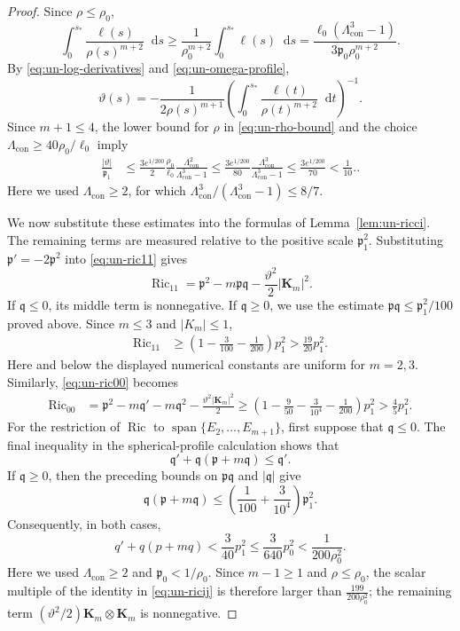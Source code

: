 \documentclass[11pt,reqno]{amsart}
\theoremstyle{definition}
\numberwithin{equation}{section}
\DeclareMathOperator{\Ric}{Ric}
\newcommand{\dd}{\mathop{}\!\mathrm d}
\begin{document}
\begin{proof}
Since \(\rho\le\rho_0\),
\[
 \int_0^{s_*}\frac{\ell(s)}{\rho(s)^{m+2}}\dd s
 \ge\frac1{\rho_0^{m+2}}\int_0^{s_*}\ell(s)\dd s
 =\frac{\ell_0(\Lambda_{\mathrm{con}}^3-1)}
 {3\mathfrak p_0\rho_0^{m+2}}.
\]
By \eqref{eq:un-log-derivatives} and
\eqref{eq:un-omega-profile},
\[
 \vartheta(s)=-\frac1{2\rho(s)^{m+1}}
 \left(\int_0^{s_*}\frac{\ell(t)}{\rho(t)^{m+2}}\dd t\right)^{-1}.
\]
Since \(m+1\le4\), the lower bound for \(\rho\) in
\eqref{eq:un-rho-bound} and the choice
\(\Lambda_{\mathrm{con}}\ge40\rho_0/\ell_0\) imply
\begin{align}
 \frac{|\vartheta|}{\mathfrak p_1}
 &\le\frac{3e^{1/200}}2
       \frac{\rho_0}{\ell_0}
       \frac{\Lambda_{\mathrm{con}}^2}
            {\Lambda_{\mathrm{con}}^3-1}\le\frac{3e^{1/200}}{80}
       \frac{\Lambda_{\mathrm{con}}^3}
            {\Lambda_{\mathrm{con}}^3-1}\le\frac{3e^{1/200}}{70}<\frac{1}{10}..
 \label{eq:un-twist-rate-bound}
\end{align}
Here we used \(\Lambda_{\mathrm{con}}\ge2\), for which
\(\Lambda_{\mathrm{con}}^3/
(\Lambda_{\mathrm{con}}^3-1)\le8/7\).

We now substitute these estimates into the formulas of
Lemma~\ref{lem:un-ricci}.  The remaining terms are measured relative to
the positive scale \(\mathfrak p_1^2\).  Substituting
\(\mathfrak p'=-2\mathfrak p^2\) into
\eqref{eq:un-ric11} gives
\[
 \Ric_{11}=\mathfrak p^2-m\mathfrak p\mathfrak q
            -\frac{\vartheta^2}{2}|\mathbf K_m|^2.
\]
If \(\mathfrak q\le0\), its middle term is nonnegative.  If
\(\mathfrak q\ge0\), we use the estimate
\(\mathfrak p\mathfrak q\le\mathfrak p_1^2/100\) proved above.
Since \(m\le3\) and \(|K_m|\le1\),
\begin{align*}
 \Ric_{11}
 &\ge\left(
  1-\frac{3}{100}-\frac{1}{200}
 \right)p_1^2
 >\frac{19}{20}p_1^2.
\end{align*}
Here and below the displayed numerical constants are uniform for
\(m=2,3\).  Similarly, \eqref{eq:un-ric00} becomes
\begin{align*}
 \Ric_{00}
 &=\mathfrak p^2-m\mathfrak q'-m\mathfrak q^2
   -\frac{\vartheta^2\lvert\mathbf K_m\rvert^2}{2}\ge
 \left(
  1-\frac{9}{50}-\frac{3}{10^4}-\frac{1}{200}
 \right)p_1^2
 >
 \frac45p_1^2.
\end{align*}
For the restriction of \(\Ric\) to
\(\operatorname{span}\{E_2,\ldots,E_{m+1}\}\), first suppose that
\(\mathfrak q\le0\).  The final inequality in the spherical-profile
calculation shows that
\[
 \mathfrak q'+\mathfrak q(\mathfrak p+m\mathfrak q)
 \le\mathfrak q'.
\]
If \(\mathfrak q\ge0\), then the preceding bounds on
\(\mathfrak p\mathfrak q\) and \(|\mathfrak q|\) give
\[
 \mathfrak q(\mathfrak p+m\mathfrak q)
 \le\left(\frac1{100}+\frac3{10^4}\right)\mathfrak p_1^2.
\]
Consequently, in both cases,
\[
q'+q(p+mq)
 <
 \frac{3}{40}p_1^2
 \le
 \frac{3}{640}p_0^2
 <
 \frac{1}{200\rho_0^2}.
\]
Here we used \(\Lambda_{\mathrm{con}}\ge2\) and
\(\mathfrak p_0<1/\rho_0\).  Since \(m-1\ge1\)
and \(\rho\le\rho_0\), the scalar multiple of the identity in
\eqref{eq:un-ricij} is therefore larger than
\(\frac{199}{200\rho_0^2}\); the remaining term
\((\vartheta^2/2)\mathbf K_m\otimes\mathbf K_m\) is nonnegative.


\end{proof}
\end{document}
